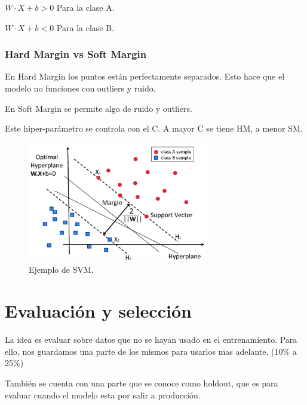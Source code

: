 \documentclass[titlepage,a4paper]{article}
\begin{document}
\begin{center}
\begin{math}
W \cdot X + b > 0
\end{math}
Para la clase A.

\begin{math}
W \cdot X + b < 0
\end{math}
Para la clase B.
\end{center}

\subsubsection*{Hard Margin vs Soft Margin}

En Hard Margin los puntos están perfectamente separados. Esto hace que el modelo no funciones con outliers y ruido.

En Soft Margin se permite algo de ruido y outliers.

Este hiper-parámetro se controla con el C. A mayor C se tiene HM, a menor SM.

\begin{figure}[!htb]
    \centering
    \includegraphics[width=0.7\textwidth]{imagenesResumen/SVM.png}
    \caption{Ejemplo de SVM.}
\end{figure}

\newpage

\section{Evaluación y selección}

La idea es evaluar sobre datos que no se hayan usado en el entrenamiento. Para ello, nos guardamos una parte de los mismos para usarlos mas adelante. (10\% a 25\%)

También se cuenta con una parte que se conoce como holdout, que es para evaluar cuando el modelo esta por salir a producción.
\end{document}
